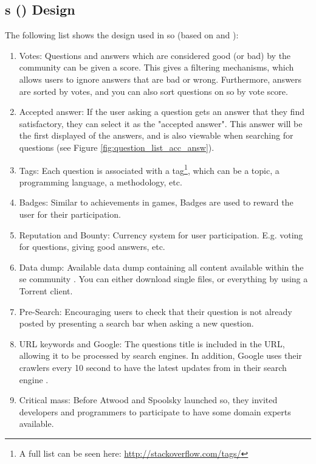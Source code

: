 \subsection[Stack Overflows design]{s () Design}
\label{sec:stackoverflow_design}
The following list shows the design used in \gls{so} (based on \cite[p.~6-7]{Sewak2010} and \cite[p.~805]{Treude2011}):
\begin{enumerate}
	\item Votes: Questions and answers which are considered good (or bad) by the community can be given a score. 
	This gives a filtering mechanisms, which allows users to ignore answers that are bad or wrong. 
	Furthermore, answers are sorted by votes, and you can also sort questions on \gls{so} by vote score. 
	\item Accepted answer: If the user asking a question gets an answer that they find satisfactory, they can select it as the "accepted answer". 
	This answer will be the first displayed of the answers, and is also viewable when searching for questions (see Figure \ref{fig:question_list_acc_answ}).
	\item Tags: Each question is associated with a tag\footnote{
		A full list can be seen here: \url{http://stackoverflow.com/tags/}
	}, which can be a topic, a programming language, a methodology, etc.
	\item Badges: Similar to achievements in games, Badges are used to reward the user for their participation.
	\item Reputation and Bounty: Currency system for user participation. E.g. voting for questions, giving good answers, etc.
	\item Data dump: Available data dump containing all content available within the \gls{se} community \cite{StackExchange2016}. 
	You can either download single files, or everything by using a Torrent client.
	\item Pre-Search: Encouraging users to check that their question is not already posted by presenting a search bar when asking a new question. 
	\item URL keywords and Google: The questions title is included in the URL, allowing it to be processed by search engines. 
	In addition, Google uses their crawlers every 10 second to have the latest updates from  in their search engine \cite{Gobry2011}.
	\item Critical mass: Before Atwood and Spoolsky launched \gls{so}, they invited developers and programmers to participate to have some domain experts available. 
\end{enumerate}

